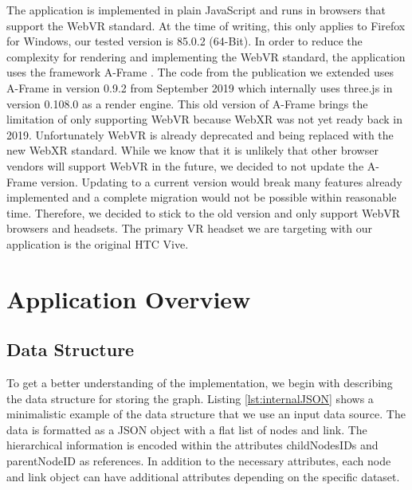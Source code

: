 The application is implemented in plain JavaScript and runs in browsers that support the WebVR standard. 
At the time of writing, this only applies to Firefox for Windows, our tested version is 85.0.2 (64-Bit). 
In order to reduce the complexity for rendering and implementing the WebVR standard, the application uses the framework A-Frame \cite{aframe}. The code from the publication we extended uses A-Frame in version 0.9.2 from September 2019 which internally uses three.js \cite{threejs} in version 0.108.0 as a render engine.
This old version of A-Frame brings the limitation of only supporting WebVR because WebXR was not yet ready back in 2019.
Unfortunately WebVR is already deprecated and being replaced with the new WebXR standard.
While we know that it is unlikely that other browser vendors will support WebVR in the future, we decided to not update the A-Frame version. Updating to a current version would break many features already implemented and a complete migration would not be possible within reasonable time. Therefore, we decided to stick to the old version and only support WebVR browsers and headsets.
The primary VR headset we are targeting with our application is the original HTC Vive.

\section{Application Overview}

\label{sec:applOverview}
\subsection{Data Structure}
\label{subSec:dataStruct}
To get a better understanding of the implementation, we begin with describing the data structure for storing the graph.
Listing \ref{lst:internalJSON} shows a minimalistic example of the data structure that we use an input data source. The data is formatted as a JSON object with a flat list of nodes and link. The hierarchical information is encoded within the attributes childNodesIDs and parentNodeID as references. 
In addition to the necessary attributes, each node and link object can have additional attributes depending on the specific dataset.
\pagebreak

